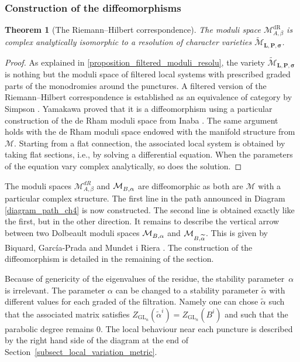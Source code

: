 \documentclass[11pt]{article}
\newcommand{\ie}{i.e.,\xspace}
\newcommand{\Subsubsection}{\subsubsection}
\newcommand{\NoChangel}[1]{%
\expandafter\let\csname old\string#1\endcsname=#1
\let#1=\relax
\newcommand{#1}{\mathcode`l="716C\csname old\string#1\endcsname\mathcode`l="7160 }%
}
\newcommand{\Dol}{\mathrm{Dol}}\NoChangel{\Dol}
\newcommand{\dR}{\mathrm{dR}}
\theoremstyle{definition}
\theoremstyle{plain}
\newtheorem{theorem}[definition]{Theorem}
\DeclareMathOperator{\GL}{GL}
\newcommand{\mlps}{\widetilde{\mathcal{M}}_{\boldsymbol{L},\boldsymbol{P},\boldsymbol{\sigma}}}
\begin{document}
\Subsubsection{Construction of the diffeomorphisms}
\begin{theorem}[The Riemann--Hilbert correspondence]
The moduli space $\mathcal{M}^{\dR}_{A,\beta}$ is complex analytically isomorphic to a resolution of character varieties $\mlps$.
\end{theorem}
\begin{proof}
As explained in \ref{proposition_filtered_moduli_resolu}, the variety $\mlps$ is nothing but the moduli space of filtered local systems with prescribed graded parts of the monodromies around the punctures. A filtered version of the Riemann--Hilbert correspondence is established as an equivalence of category by Simpson \cite{Simpson}. Yamakawa \cite{Yamakawa} proved that it is a diffeomorphism using a particular construction of the de Rham moduli space from Inaba \cite{Inaba13}. The same argument holds with the de Rham moduli space endowed with the manifold structure from $\mathcal{M}$. Starting from a flat connection, the associated local system is obtained by taking flat sections, \ie by solving a differential equation. When the parameters of the equation vary complex analytically, so does the solution.
\end{proof}

The moduli spaces $\mathcal{M}^{dR}_{A,\beta}$ and $\mathcal{M}^{\Dol}_{B,\alpha}$ are diffeomorphic as both are $\mathcal{M}$ with a particular complex structure. The first line in the path announced in Diagram \ref{diagram_path_ch4} is now constructed. The second line is obtained exactly like the first, but in the other direction. It remains to describe the vertical arrow between two Dolbeault moduli spaces $\mathcal{M}^{\Dol}_{B,\alpha}$ and $\mathcal{M}^{\Dol}_{B,\widetilde{\alpha}}$. This is given by Biquard, García-Prada and Mundet i Riera \cite[Th.\,7.10]{Biquard_Garcia_Prada_Riera}. The construction of the diffeomorphism is detailed in the remaining of the section.

Because of genericity of the eigenvalues of the residue, the stability parameter~$\alpha$ is irrelevant. The parameter $\alpha$ can be changed to a stability parameter $\widetilde{\alpha}$ with different values for each graded of the filtration. Namely one can chose $\widetilde{\alpha}$ such that the associated matrix satisfies $Z_{\GL_n}(\widetilde{\alpha}^{i})=Z_{\GL_n}(B^i)$ and such that the parabolic degree remains $0$. The local behaviour near each puncture is described by the right hand side of the diagram at the end of Section~\ref{subsect_local_variation_metric}.
\end{document}
